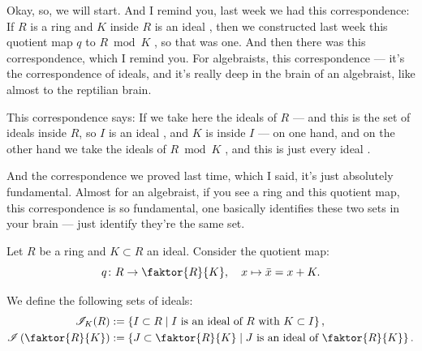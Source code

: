 \begin{speech}[00:00:01 - 00:01:36]
Okay, so, we will start. And I remind you, last week we had this correspondence: If $R$ is a ring and $K$ inside $R$ is an ideal , then we constructed last week this quotient map $q$ to $R \bmod K$ , so that was one. And then there was this correspondence, which I remind you. For algebraists, this correspondence --- it's the correspondence of ideals, and it's really deep in the brain of an algebraist, like almost to the reptilian brain.

This correspondence says: If we take here the ideals of $R$  --- and this is the set of ideals inside $R$, so $I$ is an ideal , and $K$ is inside $I$  --- on one hand, and on the other hand we take the ideals of $R \bmod K$ , and this is just every ideal .

And the correspondence we proved last time, which I said, it's just absolutely fundamental. Almost for an algebraist, if you see a ring and this quotient map, this correspondence is so fundamental, one basically identifies these two sets in your brain --- just identify they're the same set.
\end{speech}

\begin{content}
Let $R$ be a ring and $K \subset R$ an ideal. Consider the quotient map:
\begin{equation}\label{eq:canonical-quotient-map}
q \colon R \to \faktor{R}{K}, \quad x \mapsto \bar{x} = x + K.
\end{equation}

We define the following sets of ideals:
\begin{align}
\mathscr{I}_K(R) &:= \left\{ I \subset R \;\middle|\; I \text{ is an ideal of } R \text{ with } K \subset I \right\}, \label{eq:ideals-containing-k} \\
\mathscr{I}\left(\faktor{R}{K}\right) &:= \left\{ J \subset \faktor{R}{K} \;\middle|\; J \text{ is an ideal of } \faktor{R}{K} \right\}. \label{eq:ideals-in-quotient}
\end{align}
\end{content}

